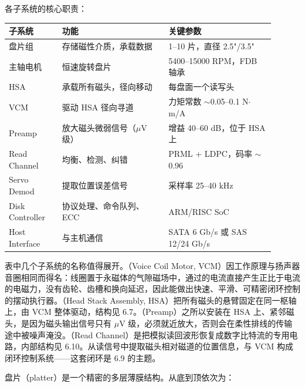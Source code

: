 各子系统的核心职责：

\begin{longtable}{L{0.18\linewidth}L{0.36\linewidth}L{0.36\linewidth}}
\toprule
子系统 & 功能 & 关键参数 \\
\midrule
盘片组 & 存储磁性介质，承载数据 & 1--10 片，直径 2.5"/3.5" \\
主轴电机 & 恒速旋转盘片 & 5400--15000 RPM，FDB 轴承 \\
HSA & 承载所有磁头，径向移动 & 每盘面一个读写头 \\
VCM & 驱动 HSA 径向寻道 & 力矩常数 $\sim$0.05--0.1 N$\cdot$m/A \\
Preamp & 放大磁头微弱信号（$\mu$V 级） & 增益 40--60 dB，位于 HSA 上 \\
Read Channel & 均衡、检测、纠错 & PRML + LDPC，码率 $\sim$0.96 \\
Servo Demod & 提取位置误差信号 & 采样率 25--40 kHz \\
Disk Controller & 协议处理、命令队列、ECC & ARM/RISC SoC \\
Host Interface & 与主机通信 & SATA 6 Gb/s 或 SAS 12/24 Gb/s \\
\bottomrule
\end{longtable}

表中几个子系统的名称值得展开。（Voice Coil Motor, VCM）因工作原理与扬声器音圈相同而得名：线圈置于永磁体的气隙磁场中，通过的电流直接产生正比于电流的电磁力，没有齿轮、齿槽和换向延迟，因此能做出快速、平滑、可精密闭环控制的摆动执行器。（Head Stack Assembly, HSA）把所有磁头的悬臂固定在同一枢轴上，由 VCM 整体驱动，结构见 6.7。（Preamp）之所以安装在 HSA 上、紧邻磁头，是因为磁头输出信号只有 $\mu$V 级，必须就近放大，否则会在柔性排线的传输途中被噪声淹没。（Read Channel）是把模拟读回波形恢复成数字比特流的专用电路，内部结构见 6.10。从读信号中提取磁头相对磁道的位置信息，与 VCM 构成闭环控制系统——这套闭环是 6.9 的主题。


盘片（platter）是一个精密的多层薄膜结构。从底到顶依次为：

